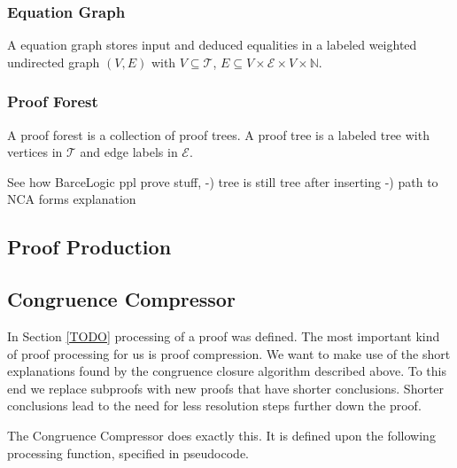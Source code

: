 \subsubsection*{Equation Graph}

A equation graph stores input and deduced equalities in a labeled weighted undirected graph $(V,E)$ with 
$V \subseteq \mathcal{T}$, $E \subseteq V \times \mathcal{E} \times V \times \mathbb{N}$.







\subsubsection*{Proof Forest}

A proof forest is a collection of proof trees.
A proof tree is a labeled tree with vertices in $\mathcal{T}$ and edge labels in $\mathcal{E}$.



See how BarceLogic ppl prove stuff,
-) tree is still tree after inserting
-) path to NCA forms explanation


\subsection*{Proof Production}



\subsection*{Congruence Compressor}

In Section \ref{TODO} processing of a proof was defined.
The most important kind of proof processing for us is proof compression.
We want to make use of the short explanations found by the congruence closure algorithm described above.
To this end we replace subproofs with new proofs that have shorter conclusions.
Shorter conclusions lead to the need for less resolution steps further down the proof.

The Congruence Compressor does exactly this. It is defined upon the following processing function, specified in pseudocode.

